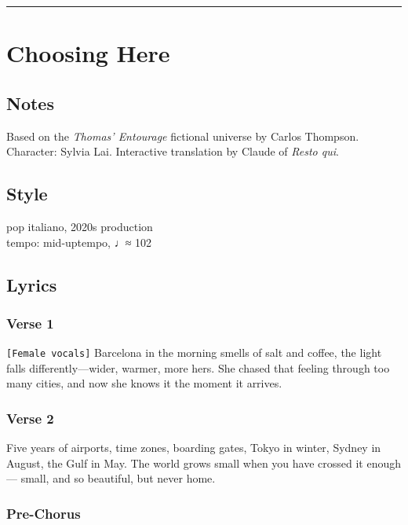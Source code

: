 \begin{center}\rule{0.5\linewidth}{0.5pt}\end{center}

\section{Choosing Here}\label{choosing-here}

\subsection{Notes}\label{notes-20}

Based on the \emph{Thomas' Entourage} fictional universe by Carlos
Thompson. Character: Sylvia Lai. Interactive translation by Claude of
\emph{Resto qui}.

\subsection{Style}\label{style-19}

pop italiano, 2020s production\\
tempo: mid-uptempo, ♩≈ 102

\subsection{Lyrics}\label{lyrics-19}

\subsubsection{Verse 1}\label{verse-1-15}

\texttt{{[}Female\ vocals{]}} Barcelona in the morning smells of salt
and coffee, the light falls differently---wider, warmer, more hers. She
chased that feeling through too many cities, and now she knows it the
moment it arrives.

\subsubsection{Verse 2}\label{verse-2-15}

Five years of airports, time zones, boarding gates, Tokyo in winter,
Sydney in August, the Gulf in May. The world grows small when you have
crossed it enough--- small, and so beautiful, but never home.

\subsubsection{Pre-Chorus}\label{pre-chorus-34}

